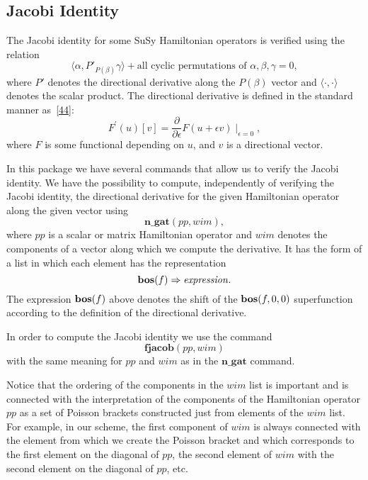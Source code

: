 {\subsection{Jacobi Identity}

The Jacobi identity for some SuSy Hamiltonian operators is verified
using the relation
\begin{equation*}
  \langle \alpha, P'_{P(\beta)} \gamma \rangle +
  \text{all cyclic permutations of } \alpha,\beta,\gamma = 0,
\end{equation*}
where $P'$ denotes the directional derivative along the $P(\beta)$
vector and $\langle\cdot,\cdot\rangle$ denotes the scalar product.
The directional derivative is defined in the standard manner
as~\hyperlink{susy2-bib}{[44]}:
\begin{equation*}
  F^{'}(u)[v] = \frac{\partial}{\partial\epsilon}
  F(u+\epsilon v)\mid_{\epsilon =0},
\end{equation*}
where $F$ is some functional depending on $u$, and $v$ is a
directional vector.

In this package we have several commands that allow us to verify the
Jacobi identity.  We have the possibility to compute, independently of
verifying the Jacobi identity, the directional derivative for the
given Hamiltonian operator along the given vector using
\begin{equation*}
  \mathbf{n\_gat}(\mathit{pp}, \mathit{wim}),
\end{equation*}
where $\mathit{pp}$ is a scalar or matrix Hamiltonian operator and
$\mathit{wim}$ denotes the components of a vector along which we
compute the derivative.  It has the form of a list in which each
element has the representation
\begin{equation*}
  \mathbf{bos}(f) \Rightarrow \mathit{expression}.
\end{equation*}
The expression $\mathbf{bos}(f)$ above denotes the shift of the $\mathbf{bos}(f,0,0)$
superfunction according to the definition of the directional
derivative.

In order to compute the Jacobi identity we use the command
\begin{equation*}
  \mathbf{fjacob}(\mathit{pp}, \mathit{wim})
\end{equation*}
with the same meaning for $\mathit{pp}$ and $\mathit{wim}$ as in the
$\mathbf{n\_gat}$ command.

Notice that the ordering of the components in the $\mathit{wim}$ list
is important and is connected with the interpretation of the
components of the Hamiltonian operator $\mathit{pp}$ as a set of
Poisson brackets constructed just from elements of the $\mathit{wim}$
list.  For example, in our scheme, the first component of
$\mathit{wim}$ is always connected with the element from which we
create the Poisson bracket and which corresponds to the first element
on the diagonal of $\mathit{pp}$, the second element of $\mathit{wim}$
with the second element on the diagonal of $\mathit{pp}$, etc.

}
